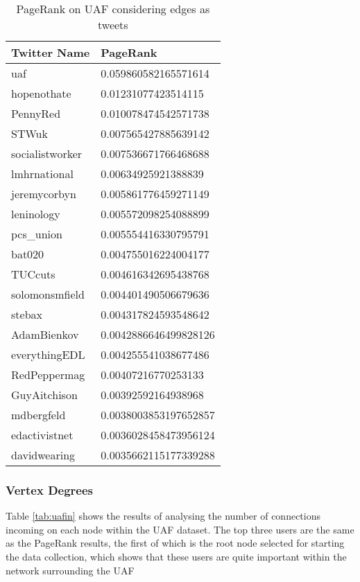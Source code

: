 \begin{table}[htbp]%
\centering
\begin{tabular}{|l|l|}
\hline
Twitter Name & PageRank \\
\hline
uaf & 0.059860582165571614 \\
hopenothate & 0.01231077423514115 \\
PennyRed & 0.010078474542571738 \\
STWuk & 0.007565427885639142 \\
socialistworker & 0.007536671766468688 \\
lmhrnational & 0.00634925921388839 \\
jeremycorbyn & 0.005861776459271149 \\
leninology & 0.005572098254088899 \\
pcs\_union & 0.005554416330795791 \\
bat020 & 0.004755016224004177 \\
TUCcuts & 0.004616342695438768 \\
solomonsmfield & 0.004401490506679636 \\
stebax & 0.004317824593548642 \\
AdamBienkov & 0.0042886646499828126 \\
everythingEDL & 0.004255541038677486 \\
RedPeppermag & 0.00407216770253133 \\
GuyAitchison & 0.00392592164938968 \\
mdbergfeld & 0.0038003853197652857 \\
edactivistnet & 0.0036028458473956124 \\
davidwearing & 0.0035662115177339288 \\
\hline
\end{tabular}
\caption{PageRank on UAF considering edges as tweets}
\label{tab:uaftweetpagerank}
\end{table}

\subsubsection{Vertex Degrees}
Table \ref{tab:uafin} shows the results of analysing the number of connections incoming on each node within the UAF dataset. The top three users are the same as the PageRank results, the first of which is the root node selected for starting the data collection, which shows that these users are quite important within the network surrounding the UAF

